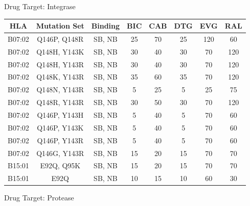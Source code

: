 \begin{table}[h]
    \centering

    Drug Target: Integrase

    \smallskip

    \begin{tabular}{||c|c|c||c|c|c|c|c||}
        \hline
        HLA    & Mutation Set & Binding & BIC & CAB & DTG & EVG & RAL \\
        \hline
        \hline
        B07:02 & Q146P, Q148R & SB, NB  & 25  & 70  & 25  & 120 & 60  \\
        \hline
        B07:02 & Q148H, Y143K & SB, NB  & 30  & 40  & 30  & 70  & 120 \\
        \hline
        B07:02 & Q148H, Y143R & SB, NB  & 30  & 40  & 30  & 70  & 120 \\
        \hline
        B07:02 & Q148K, Y143R & SB, NB  & 35  & 60  & 35  & 70  & 120 \\
        \hline
        B07:02 & Q148N, Y143R & SB, NB  & 5   & 25  & 5   & 25  & 75  \\
        \hline
        B07:02 & Q148R, Y143R & SB, NB  & 30  & 50  & 30  & 70  & 120 \\
        \hline
        B07:02 & Q146P, Y143H & SB, NB  & 5   & 40  & 5   & 70  & 60  \\
        \hline
        B07:02 & Q146P, Y143K & SB, NB  & 5   & 40  & 5   & 70  & 60  \\
        \hline
        B07:02 & Q146P, Y143R & SB, NB  & 5   & 40  & 5   & 70  & 60  \\
        \hline
        B07:02 & Q146G, Y143R & SB, NB  & 15  & 20  & 15  & 70  & 70  \\
        \hline
        B15:01 & E92Q, Q95K   & SB, NB  & 15  & 20  & 15  & 70  & 70  \\
        \hline
        B15:01 & E92Q         & SB, NB  & 10  & 15  & 10  & 60  & 30  \\
        \hline
    \end{tabular}

    \medskip

    Drug Target: Protease

    \smallskip


\end{table}
